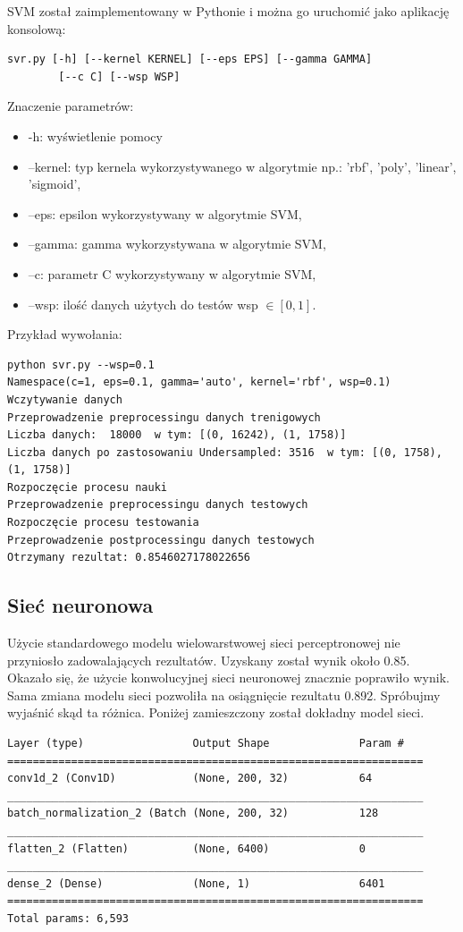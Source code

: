 \documentclass[12pt]{article}
\begin{document}
SVM został zaimplementowany w Pythonie i można go uruchomić jako aplikację konsolową:

\begin{lstlisting}
svr.py [-h] [--kernel KERNEL] [--eps EPS] [--gamma GAMMA] 
		[--c C] [--wsp WSP]
\end{lstlisting}

Znaczenie parametrów:

\begin{itemize}
    \item -h: wyświetlenie pomocy
    \item --kernel: typ kernela wykorzystywanego w algorytmie np.: 'rbf', 'poly', 'linear', 'sigmoid',
    \item --eps: epsilon wykorzystywany w algorytmie SVM,
    \item --gamma: gamma wykorzystywana w algorytmie SVM,
    \item --c: parametr C wykorzystywany w algorytmie SVM,
    \item --wsp: ilość danych użytych do testów wsp $\in [0,1]$.
\end{itemize}
\newpage
Przykład wywołania:
\begin{lstlisting}
python svr.py --wsp=0.1
Namespace(c=1, eps=0.1, gamma='auto', kernel='rbf', wsp=0.1)
Wczytywanie danych
Przeprowadzenie preprocessingu danych trenigowych
Liczba danych:  18000  w tym: [(0, 16242), (1, 1758)]
Liczba danych po zastosowaniu Undersampled: 3516  w tym: [(0, 1758), (1, 1758)]
Rozpoczęcie procesu nauki
Przeprowadzenie preprocessingu danych testowych
Rozpoczęcie procesu testowania
Przeprowadzenie postprocessingu danych testowych
Otrzymany rezultat: 0.8546027178022656
\end{lstlisting}

\subsection{Sieć neuronowa}
Użycie standardowego modelu wielowarstwowej sieci perceptronowej nie przyniosło zadowalających rezultatów. Uzyskany został wynik około 0.85. Okazało się, że użycie konwolucyjnej sieci neuronowej znacznie poprawiło wynik. Sama zmiana modelu sieci pozwoliła na osiągnięcie rezultatu 0.892. Spróbujmy wyjaśnić skąd ta różnica. Poniżej zamieszczony został dokładny model sieci.

\begin{lstlisting}[caption={Model sieci CNN}, captionpos=b]
Layer (type)                 Output Shape              Param #   
=================================================================
conv1d_2 (Conv1D)            (None, 200, 32)           64        
_________________________________________________________________
batch_normalization_2 (Batch (None, 200, 32)           128       
_________________________________________________________________
flatten_2 (Flatten)          (None, 6400)              0         
_________________________________________________________________
dense_2 (Dense)              (None, 1)                 6401      
=================================================================
Total params: 6,593
\end{lstlisting} 
\end{document}

